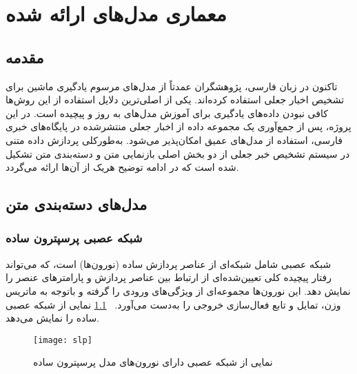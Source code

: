 \chapter{معماری مدل‌های ارائه شده}
\section{مقدمه}
تاکنون در زبان فارسی، پژوهشگران عمدتاً از مدل‌های مرسوم یادگیری ماشین برای تشخیص اخبار جعلی استفاده کرده‌اند. یکی از اصلی‌ترین دلایل استفاده از این روش‌ها کافی نبودن داده‌های یادگیری برای آموزش مدل‌های به ‌روز و پیچیده است. در این پروژه، پس از جمع‌آوری یک مجموعه داده از اخبار جعلی منتشرشده در پایگاه‌های خبری فارسی، استفاده از مدل‌های عمیق امکان‌پذیر می‌شود. به‌طورکلی پردازش داده متنی در سیستم تشخیص خبر جعلی‌ از دو بخش اصلی بازنمایی متن و دسته‌بندی متن تشکیل شده ‌است که در ادامه توضیح هریک از آن‌ها ارائه می‌گردد.
\section{مدل‌های دسته‌بندی متن}
\subsection{شبکه عصبی پرسپترون ساده}
شبکه عصبی شامل شبکه‌ای از عناصر پردازش ساده (نورون‌ها) است، که می‌تواند رفتار پیچیده کلی تعیین‌شده‌ای از ارتباط بین عناصر پردازش و پارامترهای عنصر را نمایش دهد. این نورون‌ها مجموعه‌ای از ویژگی‌های ورودی را گرفته و باتوجه‌ به ماتریس وزن، تمایل و تابع فعال‌سازی خروجی را به‌دست می‌آورد. \figurename~\ref{fig.slp} نمایی از شبکه عصبی ساده را نمایش می‌دهد.

\begin{figure}[!h]
\texttt{[image: slp]}
\centering
\caption{نمایی از شبکه عصبی دارای نورون‌های مدل پرسپترون ساده}
\label{fig.slp}
\end{figure}

